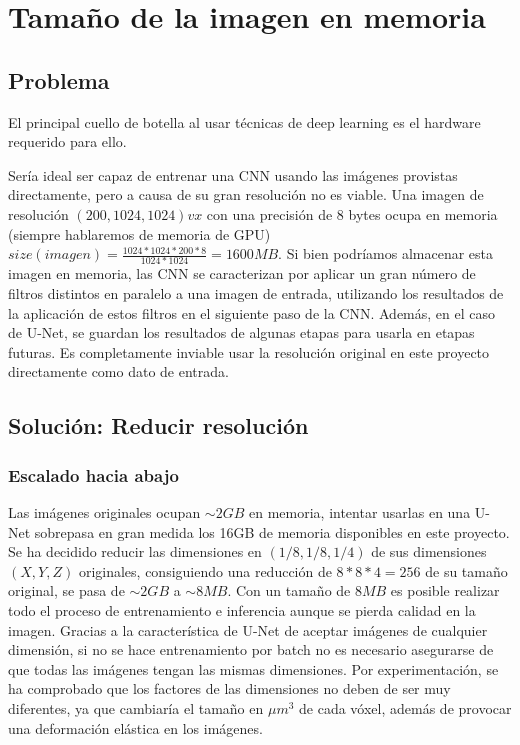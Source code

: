 \section{Tamaño de la imagen en memoria}\label{sec:size_problem}

\subsection{Problema}\label{sec:size_problem_problem}
El principal cuello de botella al usar técnicas de deep learning es el hardware requerido para ello. 

Sería ideal ser capaz de entrenar una CNN usando las imágenes provistas directamente, pero a causa de su gran resolución no es viable. Una imagen de resolución $ (200, 1024, 1024)vx $ con una precisión de 8 bytes ocupa en memoria (siempre hablaremos de memoria de GPU) $size(imagen)=\frac{1024*1024*200*8}{1024*1024}=1600MB $. Si bien podríamos almacenar esta imagen en memoria, las CNN se caracterizan por aplicar un gran número de filtros distintos en paralelo a una imagen de entrada, utilizando los resultados de la aplicación de estos filtros en el siguiente paso de la CNN. Además, en el caso de U-Net, se guardan los resultados de algunas etapas para usarla en etapas futuras. Es completamente inviable usar la resolución original en este proyecto directamente como dato de entrada.

\subsection{Solución: Reducir resolución}\label{subsec:lowscale}
\subsubsection{Escalado hacia abajo}\label{subsubsec:downscale}

Las imágenes originales ocupan $\sim 2GB$ en memoria, intentar usarlas en una U-Net sobrepasa en gran medida los 16GB de memoria disponibles en este proyecto. Se ha decidido reducir las dimensiones en $(1/8, 1/8, 1/4)$ de sus dimensiones $(X, Y, Z)$ originales, consiguiendo una reducción de $8*8*4=256$ de su tamaño original, se pasa de $\sim 2GB$ a $\sim 8MB$. Con un tamaño de $8MB$ es posible realizar todo el proceso de entrenamiento e inferencia aunque se pierda calidad en la imagen. Gracias a la característica de U-Net de aceptar imágenes de cualquier dimensión, si no se hace entrenamiento por batch no es necesario asegurarse de que todas las imágenes tengan las mismas dimensiones. Por experimentación, se ha comprobado que los factores de las dimensiones no deben de ser muy diferentes, ya que cambiaría el tamaño en $\mu m^3$ de cada vóxel, además de provocar una deformación elástica en los imágenes.

